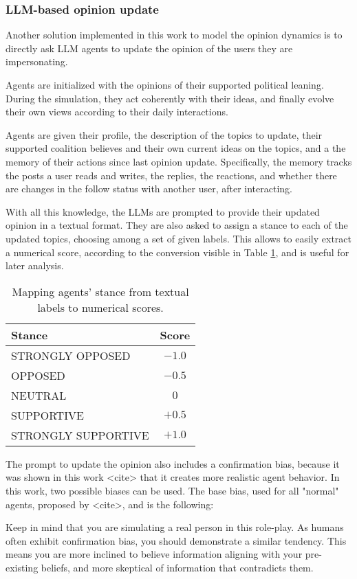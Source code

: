 \subsubsection{LLM-based opinion update}
Another solution implemented in this work to model the opinion dynamics is to directly ask LLM agents to update the opinion of the users they are impersonating.

Agents are initialized with the opinions of their supported political leaning. During the simulation, they act coherently with their ideas, and finally evolve their own views according to their daily interactions.

Agents are given their profile, the description of the topics to update, their supported coalition believes and their own current ideas on the topics, and a the memory of their actions since last opinion update.
Specifically, the memory tracks the posts a user reads and writes, the replies, the reactions, and whether there are changes in the follow status with another user, after interacting. 

With all this knowledge, the LLMs are prompted to provide their updated opinion in a textual format.
They are also asked to assign a stance to each of the updated topics, choosing among a set of given labels. This allows to easily extract a numerical score, according to the conversion visible in Table \ref{tab:stance}, and is useful for later analysis.

\begin{table}[h]
\centering
\begin{tabular}{|l|c|}
\hline
\textbf{Stance} & \textbf{Score} \\
\hline
STRONGLY OPPOSED   & $-1.0$ \\
OPPOSED            & $-0.5$ \\
NEUTRAL            & $0$ \\
SUPPORTIVE         & $+0.5$ \\
STRONGLY SUPPORTIVE & $+1.0$ \\
\hline
\end{tabular}
\caption{Mapping agents' stance from textual labels to numerical scores.}
\label{tab:stance}
\end{table}

\medskip

The prompt to update the opinion also includes a confirmation bias, because it was shown in this work <cite> that it creates more realistic agent behavior. %
In this work, two possible biases can be used. The base bias, used for all "normal" agents, proposed by <cite>, and is the following:
\begin{tcolorbox}[prompt]
    Keep in mind that you are simulating a real person in this role-play. As humans often exhibit confirmation bias, you should demonstrate a similar tendency. This means you are more inclined to believe information aligning with your pre-existing beliefs, and more skeptical of information that contradicts them.
\end{tcolorbox}

